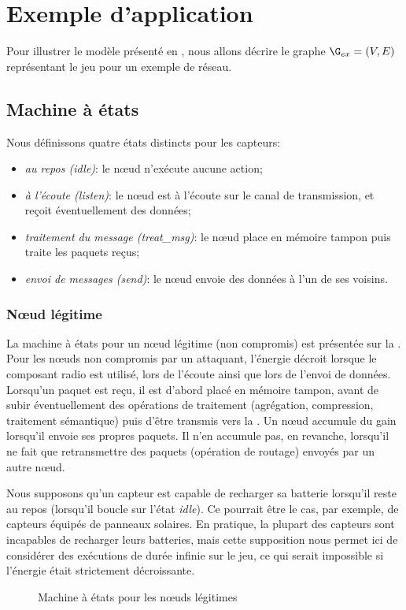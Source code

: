 \section{Exemple d'application}
\label{tj:sec:example}
Pour illustrer le modèle présenté en , nous allons décrire le graphe $\G_{ex} = (V,E)$ représentant le jeu pour un exemple de réseau.

    \subsection{Machine à états}

Nous définissons quatre états distincts pour les capteurs:
\begin{itemize}
    \item \emph{au repos (idle)}: le nœud n'exécute aucune action;
    \item \emph{à l'écoute (listen)}: le nœud est à l'écoute sur le canal de transmission, et reçoit éventuellement des données;
    \item \emph{traitement du message (treat\_msg)}: le nœud place en mémoire tampon puis traite les paquets reçus;
    \item \emph{envoi de messages (send)}: le nœud envoie des données à l'un de ses voisins.
\end{itemize}

        \subsubsection{Nœud légitime}
La machine à états pour un nœud légitime (non compromis) est présentée sur la .
Pour les nœuds non compromis par un attaquant, l'énergie décroit lorsque le composant radio est utilisé, \cad lors de l'écoute ainsi que lors de l'envoi de données.
Lorsqu'un paquet est reçu, il est d'abord placé en mémoire tampon, avant de subir éventuellement des opérations de traitement (agrégation, compression, traitement sémantique) puis d'être transmis vers la \sdb.
Un nœud accumule du gain lorsqu'il envoie ses propres paquets.
Il n'en accumule pas, en revanche, lorsqu'il ne fait que retransmettre des paquets (opération de routage) envoyés par un autre nœud.

Nous supposons qu'un capteur est capable de recharger sa batterie lorsqu'il reste au repos (\cad lorsqu'il boucle sur l'état \emph{idle}).
Ce pourrait être le cas, par exemple, de capteurs équipés de panneaux solaires.
En pratique, la plupart des capteurs sont incapables de recharger leurs batteries, mais cette supposition nous permet ici de considérer des exécutions de durée infinie sur le jeu, ce qui serait impossible si l'énergie était strictement décroissante.
\begin{figure}[H]
    \centering
    
    \caption{Machine à états pour les nœuds légitimes}\label{tj:fig:autGoodNode}
\end{figure}

